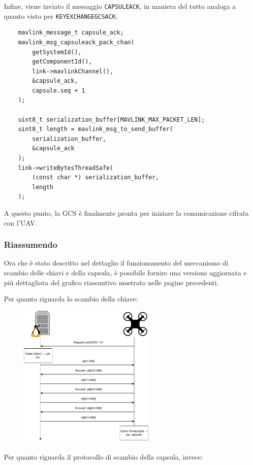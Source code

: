 \documentclass[a4paper, 12pt, oneside]{article}
\theoremstyle{definition}
\begin{document}
Infine, viene inviato il messaggio \texttt{CAPSULEACK}, in maniera del tutto analoga a quanto visto per \texttt{KEYEXCHANGEGCSACK}:

\begin{verbatim}
    mavlink_message_t capsule_ack;
    mavlink_msg_capsuleack_pack_chan(
        getSystemId(),
        getComponentId(),
        link->mavlinkChannel(),
        &capsule_ack,
        capsule.seq + 1
    );

    uint8_t serialization_buffer[MAVLINK_MAX_PACKET_LEN];
    uint8_t length = mavlink_msg_to_send_buffer(
        serialization_buffer, 
        &capsule_ack
    );
    link->writeBytesThreadSafe(
        (const char *) serialization_buffer, 
        length
    );
\end{verbatim}

A questo punto, la GCS è finalmente pronta per iniziare la comunicazione cifrata con l'UAV.

\newpage
\subsubsection{Riassumendo}
Ora che è stato descritto nel dettaglio il funzionamento del meccanismo di scambio delle chiavi e della capsula, è possibile fornire una versione aggiornata e più dettagliata del grafico riassuntivo mostrato nelle pagine precedenti.

Per quanto riguarda lo scambio della chiave:

\begin{figure}[H]
    \centering
    \includegraphics[width=0.6\textwidth]{images/key_exchange_concrete.pdf}
\end{figure}

Per quanto riguarda il protocollo di scambio della capsula, invece:
\end{document}
